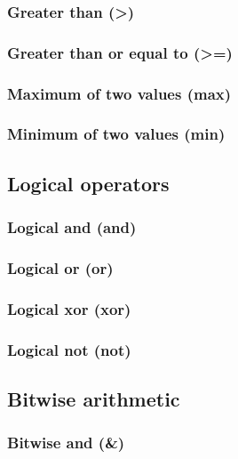 \documentclass{article}
\theoremstyle{definition}
\begin{document}
\subsubsection{Greater than (>)}

\subsubsection{Greater than or equal to (>=)}

\subsubsection{Maximum of two values (max)}

\subsubsection{Minimum of two values (min)}

\subsection{Logical operators}

\subsubsection{Logical and (and)}

\subsubsection{Logical or (or)}

\subsubsection{Logical xor (xor)}

\subsubsection{Logical not (not)}

\subsection{Bitwise arithmetic}

\subsubsection{Bitwise and (\&)}
\end{document}
